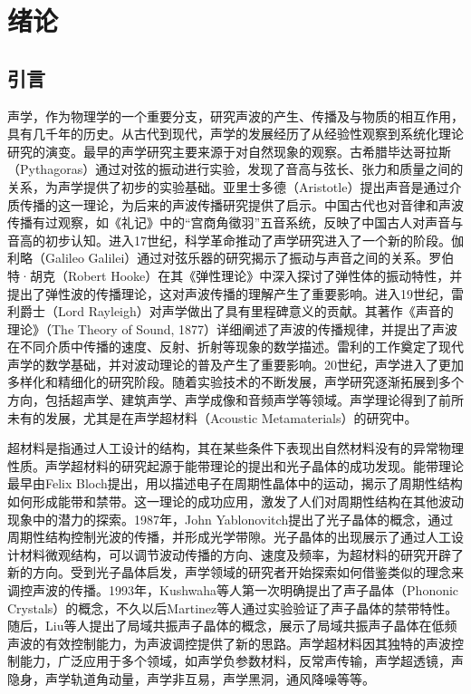 \chapter{绪论}

\section{引言}
声学，作为物理学的一个重要分支，研究声波的产生、传播及与物质的相互作用，具有几千年的历史。从古代到现代，声学的发展经历了从经验性观察到系统化理论研究的演变。最早的声学研究主要来源于对自然现象的观察。古希腊毕达哥拉斯（Pythagoras）通过对弦的振动进行实验，发现了音高与弦长、张力和质量之间的关系，为声学提供了初步的实验基础。亚里士多德（Aristotle）提出声音是通过介质传播的这一理论，为后来的声波传播研究提供了启示。中国古代也对音律和声波传播有过观察，如《礼记》中的“宫商角徵羽”五音系统，反映了中国古人对声音与音高的初步认知。进入17世纪，科学革命推动了声学研究进入了一个新的阶段。伽利略（Galileo Galilei）通过对弦乐器的研究揭示了振动与声音之间的关系。罗伯特·胡克（Robert Hooke）在其《弹性理论》中深入探讨了弹性体的振动特性，并提出了弹性波的传播理论，这对声波传播的理解产生了重要影响。进入19世纪，雷利爵士（Lord Rayleigh）对声学做出了具有里程碑意义的贡献。其著作《声音的理论》（The Theory of Sound, 1877）详细阐述了声波的传播规律，并提出了声波在不同介质中传播的速度、反射、折射等现象的数学描述。雷利的工作奠定了现代声学的数学基础，并对波动理论的普及产生了重要影响。20世纪，声学进入了更加多样化和精细化的研究阶段。随着实验技术的不断发展，声学研究逐渐拓展到多个方向，包括超声学、建筑声学、声学成像和音频声学等领域。声学理论得到了前所未有的发展，尤其是在声学超材料（Acoustic Metamaterials）的研究中。

超材料是指通过人工设计的结构，其在某些条件下表现出自然材料没有的异常物理性质。声学超材料的研究起源于能带理论的提出和光子晶体的成功发现。能带理论最早由Felix Bloch提出\cite{a1}，用以描述电子在周期性晶体中的运动，揭示了周期性结构如何形成能带和禁带。这一理论的成功应用，激发了人们对周期性结构在其他波动现象中的潜力的探索。1987年，John Yablonovitch提出了光子晶体的概念\cite{a2}，通过周期性结构控制光波的传播，并形成光学带隙。光子晶体的出现展示了通过人工设计材料微观结构，可以调节波动传播的方向、速度及频率，为超材料的研究开辟了新的方向\cite{a3,a4,a5}。受到光子晶体启发，声学领域的研究者开始探索如何借鉴类似的理念来调控声波的传播。1993年，Kushwaha等人第一次明确提出了声子晶体（Phononic Crystals）的概念\cite{b1}，不久以后Martinez等人通过实验验证了声子晶体的禁带特性\cite{b2,b3}。随后，Liu等人提出了局域共振声子晶体的概念\cite{b4}，展示了局域共振声子晶体在低频声波的有效控制能力，为声波调控提供了新的思路。声学超材料因其独特的声波控制能力，广泛应用于多个领域，如声学负参数材料\cite{c11,c12,c13,c14,c15,c16,c17,c18}，反常声传输\cite{c21,c22,c23,c24,c25,c26,c27,c28,c29}，声学超透镜\cite{c31,c32,c33,c34,c35,c36,c37,c38,c39}，声隐身\cite{c41,c42,c43,c44,c45,c46}，声学轨道角动量\cite{c51,c52,c53,c54,c55,c56,c57,c58}，声学非互易\cite{c61,c62,c63,c64,c65,c66}，声学黑洞\cite{c71,c72,c73,c74,c75,c76}，通风降噪\cite{c81,c82,c83,c84,c85}等等。

